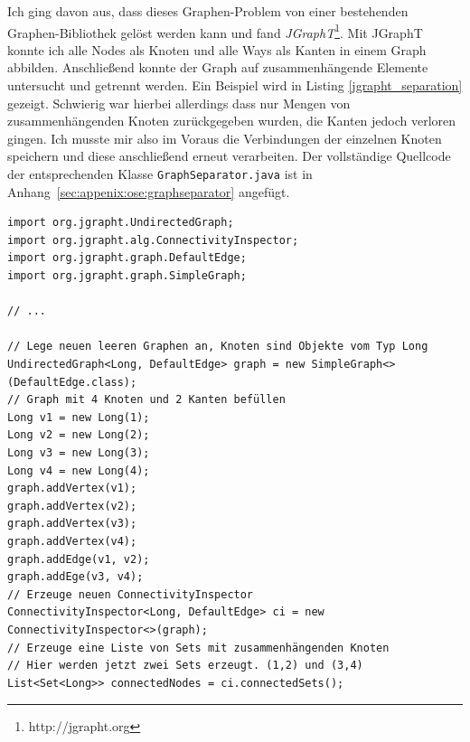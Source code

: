 Ich ging davon aus, dass dieses Graphen-Problem von einer bestehenden Graphen-Bibliothek gelöst werden kann und fand \textit{JGraphT}\footnote{http://jgrapht.org}.
Mit JGraphT konnte ich alle Nodes als Knoten und alle Ways als Kanten in einem Graph abbilden.
Anschließend konnte der Graph auf zusammenhängende Elemente untersucht und getrennt werden.
Ein Beispiel wird in Listing \ref{jgrapht_separation} gezeigt.
Schwierig war hierbei allerdings dass nur Mengen von zusammenhängenden Knoten zurückgegeben wurden, die Kanten jedoch verloren gingen.
Ich musste mir also im Voraus die Verbindungen der einzelnen Knoten speichern und diese anschließend erneut verarbeiten.
Der vollständige Quellcode der entsprechenden Klasse \texttt{GraphSeparator.java} ist in Anhang~\ref{sec:appenix:ose:graphseparator} angefügt.

\begin{lstlisting}
import org.jgrapht.UndirectedGraph;
import org.jgrapht.alg.ConnectivityInspector;
import org.jgrapht.graph.DefaultEdge;
import org.jgrapht.graph.SimpleGraph;

// ...
 
// Lege neuen leeren Graphen an, Knoten sind Objekte vom Typ Long
UndirectedGraph<Long, DefaultEdge> graph = new SimpleGraph<>(DefaultEdge.class);
// Graph mit 4 Knoten und 2 Kanten befüllen
Long v1 = new Long(1);
Long v2 = new Long(2);
Long v3 = new Long(3);
Long v4 = new Long(4);
graph.addVertex(v1);
graph.addVertex(v2);
graph.addVertex(v3);
graph.addVertex(v4);
graph.addEdge(v1, v2);
graph.addEge(v3, v4);
// Erzeuge neuen ConnectivityInspector
ConnectivityInspector<Long, DefaultEdge> ci = new ConnectivityInspector<>(graph);
// Erzeuge eine Liste von Sets mit zusammenhängenden Knoten
// Hier werden jetzt zwei Sets erzeugt. (1,2) und (3,4)
List<Set<Long>> connectedNodes = ci.connectedSets(); 
\end{lstlisting}

